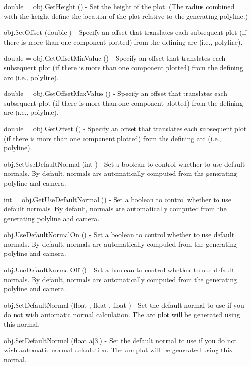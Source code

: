 \begin{DoxyItemize}
\item {\ttfamily double = obj.\-Get\-Height ()} -\/ Set the height of the plot. (The radius combined with the height define the location of the plot relative to the generating polyline.)  
\item {\ttfamily obj.\-Set\-Offset (double )} -\/ Specify an offset that translates each subsequent plot (if there is more than one component plotted) from the defining arc (i.\-e., polyline).  
\item {\ttfamily double = obj.\-Get\-Offset\-Min\-Value ()} -\/ Specify an offset that translates each subsequent plot (if there is more than one component plotted) from the defining arc (i.\-e., polyline).  
\item {\ttfamily double = obj.\-Get\-Offset\-Max\-Value ()} -\/ Specify an offset that translates each subsequent plot (if there is more than one component plotted) from the defining arc (i.\-e., polyline).  
\item {\ttfamily double = obj.\-Get\-Offset ()} -\/ Specify an offset that translates each subsequent plot (if there is more than one component plotted) from the defining arc (i.\-e., polyline).  
\item {\ttfamily obj.\-Set\-Use\-Default\-Normal (int )} -\/ Set a boolean to control whether to use default normals. By default, normals are automatically computed from the generating polyline and camera.  
\item {\ttfamily int = obj.\-Get\-Use\-Default\-Normal ()} -\/ Set a boolean to control whether to use default normals. By default, normals are automatically computed from the generating polyline and camera.  
\item {\ttfamily obj.\-Use\-Default\-Normal\-On ()} -\/ Set a boolean to control whether to use default normals. By default, normals are automatically computed from the generating polyline and camera.  
\item {\ttfamily obj.\-Use\-Default\-Normal\-Off ()} -\/ Set a boolean to control whether to use default normals. By default, normals are automatically computed from the generating polyline and camera.  
\item {\ttfamily obj.\-Set\-Default\-Normal (float , float , float )} -\/ Set the default normal to use if you do not wish automatic normal calculation. The arc plot will be generated using this normal.  
\item {\ttfamily obj.\-Set\-Default\-Normal (float a\mbox{[}3\mbox{]})} -\/ Set the default normal to use if you do not wish automatic normal calculation. The arc plot will be generated using this normal.  

\end{DoxyItemize}
